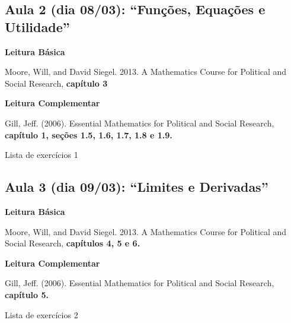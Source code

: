 \documentclass[a4paper, 12pt]{article}
\renewenvironment{itemize}{
  \begin{list}{}{
    \setlength{\leftmargin}{1.5em}
  }
}{
  \end{list}
}
\begin{document}
\subsection*{\textbf{Aula 2} (dia 08/03): ``Funções, Equações e Utilidade''} 
\begin{itemize}

\item \textbf{Leitura Básica}

\item Moore, Will, and David Siegel. 2013. A Mathematics Course for Political and Social Research, \textbf{capítulo 3}

\item \textbf{Leitura Complementar}

\item Gill, Jeff. (2006). Essential Mathematics for Political and Social Research, \textbf{capítulo 1, seções 1.5, 1.6, 1.7, 1.8 e 1.9.}

\item Lista de exercícios 1 

\end{itemize}



\subsection*{\textbf{Aula 3} (dia 09/03): ``Limites e Derivadas''} 
\begin{itemize}

\item \textbf{Leitura Básica}

\item Moore, Will, and David Siegel. 2013. A Mathematics Course for Political and Social Research, \textbf{capítulos 4, 5 e 6.}

\item \textbf{Leitura Complementar}

\item Gill, Jeff. (2006). Essential Mathematics for Political and Social Research,  \textbf{capítulo 5.}

\item Lista de exercícios 2

\end{itemize}
\end{document}
